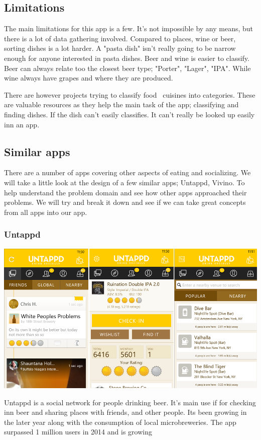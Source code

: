 \documentclass[12pt]{article}
\begin{document}
\subsection{Limitations}
The main limitations for this app is a few. It's not impossible by any means,
but there is a lot of data gathering involved. Compared to places, wine or beer,
sorting dishes is a lot harder. A "pasta dish" isn't really going to be narrow
enough for anyone interested in pasta dishes. Beer and wine is easier to
classify. Beer can always relate too the closest beer type; "Porter", "Lager",
"IPA". While wine always have grapes and where they are produced.

There are however projects trying to classify food~\cite{efsa} cuisines into
categories. These are valuable resources as they help the main task of the app;
classifying and finding dishes. If the dish can't easily classifies. It can't
really be looked up easily inn an app.


\subsection{Similar apps}
There are a number of apps covering other aspects of eating and socializing. We
will take a little look at the design of a few similar apps; Untappd, Vivino. To
help understand the problem domain and see how other apps approached their
problems. We will try and break it down and see if we can take great concepts
from all apps into our app.


\subsubsection{Untappd}
\includegraphics[width=16cm]{pictures/untapped} 
\bigbreak 

Untappd is a social network for people drinking beer.  It's main use if for
checking inn beer and sharing places with friends, and other people. Its been
growing in the later year along with the consumption of local microbreweries.
The app surpassed 1 million users in 2014 and is growing~\cite{untappd}
\end{document}
